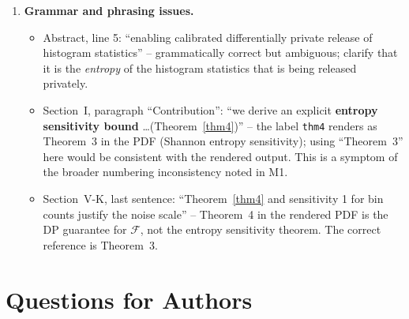 \documentclass[12pt]{article}
\begin{document}
\begin{enumerate}[label=\textbf{m\arabic*.}, leftmargin=*, wide=0pt]
\item \textbf{Grammar and phrasing issues.}
\begin{itemize}
  \item Abstract, line 5: ``enabling calibrated differentially private release of histogram statistics'' -- grammatically correct but ambiguous; clarify that it is the \emph{entropy} of the histogram statistics that is being released privately.
  \item Section~I, paragraph ``Contribution'': ``we derive an explicit \textbf{entropy sensitivity bound} \ldots (Theorem~\ref{thm4})'' -- the label \texttt{thm4} renders as Theorem~3 in the PDF (Shannon entropy sensitivity); using ``Theorem~3'' here would be consistent with the rendered output. This is a symptom of the broader numbering inconsistency noted in M1.
  \item Section~V-K, last sentence: ``Theorem~\ref{thm4} and sensitivity 1 for bin counts justify the noise scale'' -- Theorem~4 in the rendered PDF is the DP guarantee for $\mathcal{F}$, not the entropy sensitivity theorem. The correct reference is Theorem~3.
\end{itemize}

\end{enumerate}

\section{Questions for Authors}
\end{document}
